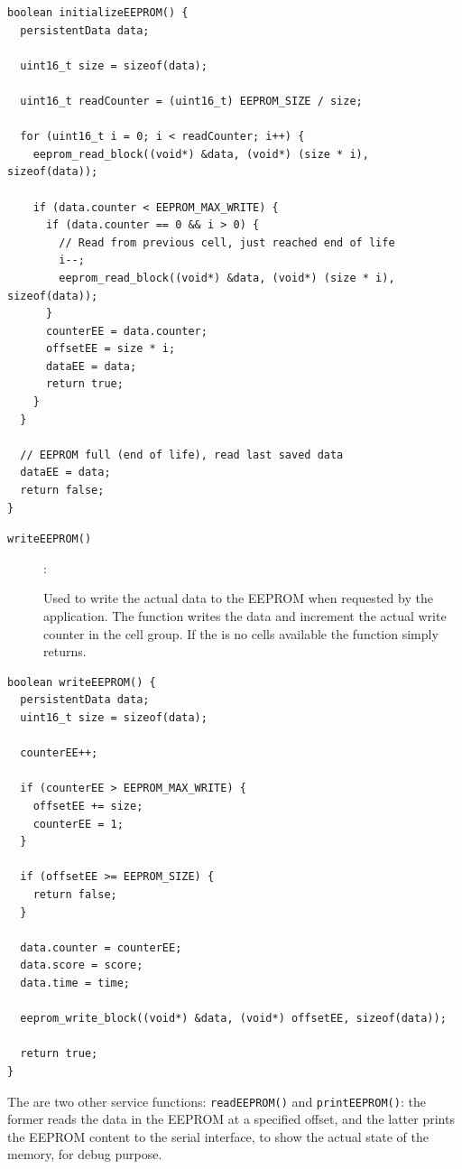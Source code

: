 \documentclass[11pt,english]{article}
\newcommand{\code}[1]{\texttt{#1}}
\begin{document}
%
\begin{lstlisting}[label=lis:initializeEEPROM,caption=initializeEEPROM() function]
boolean initializeEEPROM() {
  persistentData data;

  uint16_t size = sizeof(data);

  uint16_t readCounter = (uint16_t) EEPROM_SIZE / size;

  for (uint16_t i = 0; i < readCounter; i++) {
    eeprom_read_block((void*) &data, (void*) (size * i), sizeof(data));

    if (data.counter < EEPROM_MAX_WRITE) {
      if (data.counter == 0 && i > 0) {
        // Read from previous cell, just reached end of life
        i--;
        eeprom_read_block((void*) &data, (void*) (size * i), sizeof(data));
      }
      counterEE = data.counter;
      offsetEE = size * i;
      dataEE = data;
      return true;
    }
  }

  // EEPROM full (end of life), read last saved data
  dataEE = data;
  return false;
}
\end{lstlisting}


\begin{description}
\item[\code{writeEEPROM()}]: 

Used to write the actual data to the EEPROM when requested by the application. The function writes the data and 
increment the actual write counter in the cell group. If the is no cells available the function simply returns.
\end{description}

%
\begin{lstlisting}[label=lis:writeEEPROM,caption=writeEEPROM() function]
boolean writeEEPROM() {
  persistentData data;
  uint16_t size = sizeof(data);

  counterEE++;

  if (counterEE > EEPROM_MAX_WRITE) {
    offsetEE += size;
    counterEE = 1;
  }

  if (offsetEE >= EEPROM_SIZE) {
    return false;
  }

  data.counter = counterEE;
  data.score = score;
  data.time = time;

  eeprom_write_block((void*) &data, (void*) offsetEE, sizeof(data));

  return true;
}
\end{lstlisting}

The are two other service functions: \code{readEEPROM()} and \code{printEEPROM()}: the former reads the data in the 
EEPROM at a specified offset, and the latter prints the EEPROM content to the serial interface, to show the actual 
state of the memory, for debug purpose.
\end{document}
